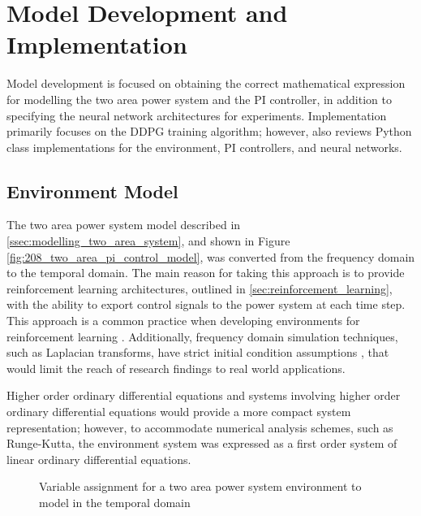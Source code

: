 \section{Model Development and Implementation}
Model development is focused on obtaining the correct mathematical expression for modelling the two area power system and the PI controller, in addition to specifying the neural network architectures for experiments. Implementation primarily focuses on the DDPG training algorithm; however, also reviews Python class implementations for the environment, PI controllers, and neural networks.


\subsection{Environment Model} \label{ssec:env_modelling}
The two area power system model described in \textsection \ref{ssec:modelling_two_area_system}, and shown in Figure \ref{fig:208_two_area_pi_control_model}, was converted from the frequency domain to the temporal domain. The main reason for taking this approach is to provide reinforcement learning architectures, outlined in \textsection \ref{sec:reinforcement_learning}, with the ability to export control signals to the power system at each time step. This approach is a common practice when developing environments for reinforcement learning \cite{Brockman2016}. Additionally, frequency domain simulation techniques, such as Laplacian transforms, have strict initial condition assumptions \cite{Ogat2010}, that would limit the reach of research findings to real world applications.

Higher order ordinary differential equations and systems involving higher order ordinary differential equations would provide a more compact system representation; however, to accommodate numerical analysis schemes, such as Runge-Kutta, the environment system was expressed as a first order system of linear ordinary differential equations.

\begin{figure}[h]
	\centering
	\resizebox{\textwidth}{!}{}
	\caption{Variable assignment for a two area power system environment to model in the temporal domain}
	\label{4101_two_area_power_system_temporal_model}
\end{figure}

